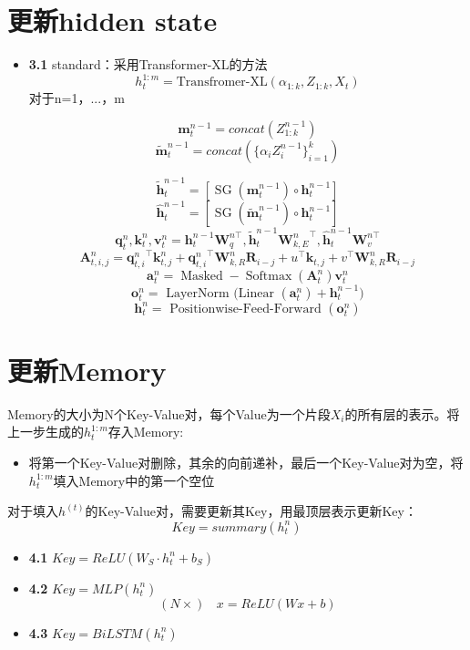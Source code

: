 \documentclass{article}
\begin{document}
\section{更新hidden state}
	\begin{itemize}
		\item \textbf{3.1} standard：采用Transformer-XL的方法
			$$h_t^{1:m} = \text{Transfromer-XL}(\alpha_{1:k}, Z_{1:k}, X_t)$$ 
			对于n=1，...，m
			
	$$\textbf{m}_t^{n-1} = concat(Z_{1:k}^{n-1})$$
	$$\tilde{\textbf{m}}_t^{n-1} = concat(\{\alpha_iZ_i^{n-1}\}_{i=1}^k) $$
			
$$\tilde{\mathbf{h}}_{t}^{n-1}=\left[\operatorname{SG}\left(\mathbf{m}_{t}^{n-1}\right) \circ \mathbf{h}_{t}^{n-1}\right]$$
$$\hat{\mathbf{h}}_{t}^{n-1}=\left[\operatorname{SG}\left(\tilde{\mathbf{m}}_{t}^{n-1}\right) \circ \mathbf{h}_{t}^{n-1}\right]$$
$$\mathbf{q}_{t}^{n}, \mathbf{k}_{t}^{n}, \mathbf{v}_{t}^{n}=\mathbf{h}_{t}^{n-1} \mathbf{W}_{q}^{n \top}, \tilde{\mathbf{h}}_{t}^{n-1} {\mathbf{W}_{k, E}^{n}}^{\top}, \hat{\mathbf{h}}_{t}^{n-1} \mathbf{W}_{v}^{n \top}$$
$$\mathbf{A}_{t, i, j}^{n}={\mathbf{q}_{t, i}^{n}}^{\top} \mathbf{k}_{t, j}^{n}+{\mathbf{q}_{t, i}^{n}}^{\top} \mathbf{W}_{k, R}^{n} \mathbf{R}_{i-j}+u^{\top} \mathbf{k}_{t, j}+v^{\top} \mathbf{W}_{k, R}^{n} \mathbf{R}_{i-j}$$
$$\mathbf{a}_{t}^{n}=\operatorname{Masked}-\operatorname{Softmax}\left(\mathbf{A}_{t}^{n}\right) \mathbf{v}_{t}^{n}$$
$$\mathbf{o}_{t}^{n}=\text { LayerNorm (Linear }\left(\mathbf{a}_{t}^{n}\right)+\mathbf{h}_{t}^{n-1} )$$
$$\mathbf{h}_{t}^{n}=\text { Positionwise-Feed-Forward }\left(\mathbf{o}_{t}^{n}\right)$$


	\end{itemize}
\section{更新Memory}
	Memory的大小为N个Key-Value对，每个Value为一个片段$X_i$的所有层的表示。将上一步生成的$h_t^{1:m}$存入Memory:
	\begin{itemize}
		\item 将第一个Key-Value对删除，其余的向前递补，最后一个Key-Value对为空，将$h_t^{1:m}$填入Memory中的第一个空位
	\end{itemize}
	对于填入$h^{(t)}$的Key-Value对，需要更新其Key，用最顶层表示更新Key：
	$$Key = summary(h_t^n)$$
	\begin{itemize}
		\item \textbf{4.1} $Key = ReLU(W_S\cdot h_t^n + b_S)$
		\item \textbf{4.2} $Key = MLP(h_t^n)$
			$$(N \times)\ \ \ \  x = ReLU(Wx + b)$$
		\item \textbf{4.3} $Key = BiLSTM(h_t^n)$
	\end{itemize}


\end{document}
